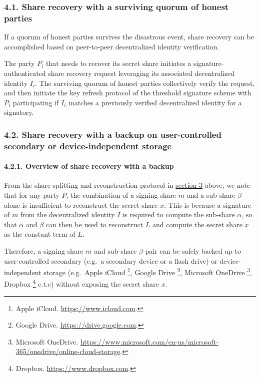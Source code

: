 \documentclass[
]{article}
\begin{document}
\hypertarget{share-recovery-quorum}{%
\subsubsection{4.1. Share recovery with a surviving quorum of honest
parties}\label{share-recovery-quorum}}

If a quorum of honest parties survives the disastrous event, share
recovery can be accomplished based on peer-to-peer decentralized
identity verification.

The party \(P_i\) that needs to recover its secret share initiates a
signature-authenticated share recovery request leveraging its associated
decentralized identity \(I_i\). The surviving quorum of honest parties
collectively verify the request, and then initiate the key refresh
protocol of the threshold signature scheme with \(P_i\) participating if
\(I_i\) matches a previously verified decentralized identity for a
signatory.

\hypertarget{share-recovery-backup}{%
\subsubsection{4.2. Share recovery with a backup on user-controlled
secondary or device-independent storage}\label{share-recovery-backup}}

\hypertarget{share-recovery-backup-overview}{%
\paragraph{4.2.1. Overview of share recovery with a
backup}\label{share-recovery-backup-overview}}

From the share splitting and reconstruction protocol in
\protect\hyperlink{share-splitting-and-reconstruction}{section 3} above,
we note that for any party \(P\), the combination of a signing share
\(m\) and a sub-share \(\beta\) alone is insufficient to reconstruct the
secret share \(x\). This is because a signature of \(m\) from the
decentralized identity \(I\) is required to compute the sub-share
\(\alpha\), so that \(\alpha\) and \(\beta\) can then be used to
reconstruct \(L\) and compute the secret share \(x\) as the constant
term of \(L\).

Therefore, a signing share \(m\) and sub-share \(\beta\) pair can be
safely backed up to user-controlled secondary (e.g.~a secondary device
or a flash drive) or device-independent storage (e.g.~Apple iCloud
\footnote{Apple iCloud. \url{https://www.icloud.com}.}, Google Drive
\footnote{Google Drive. \url{https://drive.google.com}.}, Microsoft
OneDrive \footnote{Microsoft OneDrive.
  \url{https://www.microsoft.com/en-us/microsoft-365/onedrive/online-cloud-storage}.},
Dropbox \footnote{Dropbox. \url{https://www.dropbox.com}.} e.t.c)
without exposing the secret share \(x\).
\end{document}
